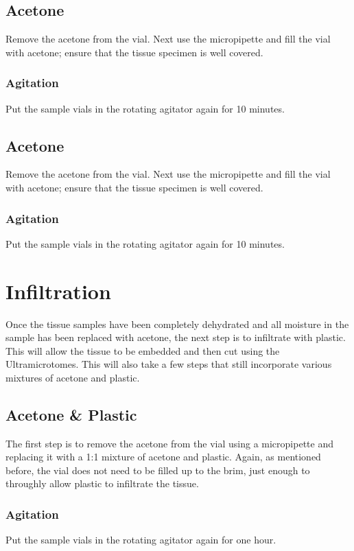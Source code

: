 \subsection{Acetone}
Remove the acetone from the vial.  Next use the micropipette and fill the vial
with acetone; ensure that the tissue specimen is well covered.

\subsubsection{Agitation}
Put the sample vials in the rotating agitator again for 10 minutes. 

\subsection{Acetone}
Remove the acetone from the vial.  Next use the micropipette and fill the vial
with acetone; ensure that the tissue specimen is well covered.

\subsubsection{Agitation}
Put the sample vials in the rotating agitator again for 10 minutes.

\section{Infiltration}\label{infiltration}
Once the tissue samples have been completely dehydrated and all moisture in the
sample has been replaced with acetone, the next step is to infiltrate with
plastic.  This will allow the tissue to be embedded and then cut using the
Ultramicrotomes.  This will also take a few steps that still incorporate
various mixtures of acetone and plastic.

\subsection{Acetone \& Plastic}\label{acetone mix one}
The first step is to remove the acetone from the vial using a micropipette and
replacing it with a 1:1 mixture of acetone and plastic.  Again, as mentioned
before, the vial does not need to be filled up to the brim, just enough to
throughly allow plastic to infiltrate the tissue.

\subsubsection{Agitation}
Put the sample vials in the rotating agitator again for one hour.

